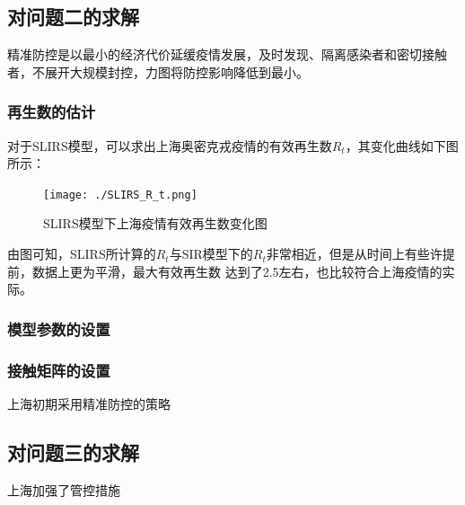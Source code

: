 \documentclass[bwprint]{gmcmthesis}
\numberwithin{figure}{section}
\begin{document}
\subsection{对问题二的求解}
精准防控是以最小的经济代价延缓疫情发展，及时发现、隔离感染者和密切接触者，不展开大规模封控，力图将防控影响降低到最小。
\subsubsection{再生数的估计}
\par 对于SLIRS模型，可以求出上海奥密克戎疫情的有效再生数$R_t$，其变化曲线如下图所示：
\begin{figure}[!h]
  \centering
  \texttt{[image: ./SLIRS\_R\_t.png]}
  \caption{SLIRS模型下上海疫情有效再生数变化图}
  \label{fig1}
\end{figure}
\par 由图可知，SLIRS所计算的$R_t$与SIR模型下的$R_t$非常相近，但是从时间上有些许提前，数据上更为平滑，最大有效再生数
达到了2.5左右，也比较符合上海疫情的实际。

\subsubsection{模型参数的设置}
\subsubsection{接触矩阵的设置}
上海初期采用精准防控的策略
\subsection{对问题三的求解}
上海加强了管控措施
\end{document}
